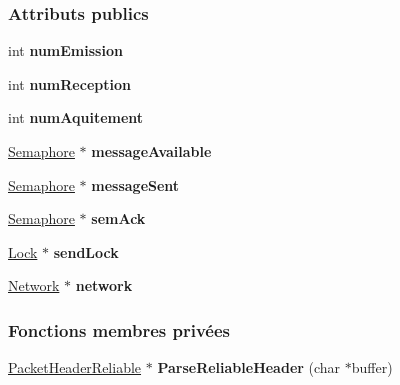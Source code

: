 \subsubsection*{Attributs publics}
\begin{DoxyCompactItemize}
\item 
\hypertarget{class_reliable_net_a2b8f53f82f8bbc14fbd61e656a1b2bf7}{}\label{class_reliable_net_a2b8f53f82f8bbc14fbd61e656a1b2bf7} 
int {\bfseries num\+Emission}
\item 
\hypertarget{class_reliable_net_a89dd42abf2f20db3c239ee4cb9096b43}{}\label{class_reliable_net_a89dd42abf2f20db3c239ee4cb9096b43} 
int {\bfseries num\+Reception}
\item 
\hypertarget{class_reliable_net_a31f7189a74f1c2cedb1f355a2fc222de}{}\label{class_reliable_net_a31f7189a74f1c2cedb1f355a2fc222de} 
int {\bfseries num\+Aquitement}
\item 
\hypertarget{class_reliable_net_ab5cd346bc4e9f5f37a379114e1840dd1}{}\label{class_reliable_net_ab5cd346bc4e9f5f37a379114e1840dd1} 
\hyperlink{class_semaphore}{Semaphore} $\ast$ {\bfseries message\+Available}
\item 
\hypertarget{class_reliable_net_a278709034417b8c15e736a66ad8b52a7}{}\label{class_reliable_net_a278709034417b8c15e736a66ad8b52a7} 
\hyperlink{class_semaphore}{Semaphore} $\ast$ {\bfseries message\+Sent}
\item 
\hypertarget{class_reliable_net_a57b3ae835a3fdb4a5f7420eab3be01d3}{}\label{class_reliable_net_a57b3ae835a3fdb4a5f7420eab3be01d3} 
\hyperlink{class_semaphore}{Semaphore} $\ast$ {\bfseries sem\+Ack}
\item 
\hypertarget{class_reliable_net_a864d332a8b3cb5bcb2458871e8c0528e}{}\label{class_reliable_net_a864d332a8b3cb5bcb2458871e8c0528e} 
\hyperlink{class_lock}{Lock} $\ast$ {\bfseries send\+Lock}
\item 
\hypertarget{class_reliable_net_a1d6258162bb327de9949f761031ababd}{}\label{class_reliable_net_a1d6258162bb327de9949f761031ababd} 
\hyperlink{class_network}{Network} $\ast$ {\bfseries network}
\end{DoxyCompactItemize}
\subsubsection*{Fonctions membres privées}
\begin{DoxyCompactItemize}
\item 
\hypertarget{class_reliable_net_ab0a8c754689d60dd9cde47953e8bc262}{}\label{class_reliable_net_ab0a8c754689d60dd9cde47953e8bc262} 
\hyperlink{struct_packet_header_reliable}{Packet\+Header\+Reliable} $\ast$ {\bfseries Parse\+Reliable\+Header} (char $\ast$buffer)
\end{DoxyCompactItemize}
